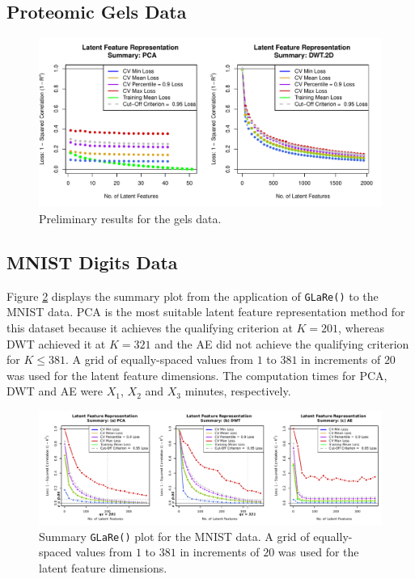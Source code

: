 \subsection{Proteomic Gels Data}\label{sec:gels-reults}

\begin{figure}
    \centering
    \includegraphics[width=1\linewidth]{figures/initial-gels.pdf}
    \caption{Preliminary results for the gels data.}
    \label{fig:enter-label}
\end{figure}


\subsection{MNIST Digits Data}\label{sec:mnist-reults}

Figure \ref{fig:mnist-results} displays the summary plot from the application of \texttt{GLaRe()} to the MNIST data.
PCA is the most suitable latent feature representation method for this dataset because it achieves the qualifying criterion at $K=201$, whereas DWT achieved it at $K=321$ and the AE did not achieve the qualifying criterion for $K \leq 381$.
A grid of equally-spaced values from $1$ to $381$ in increments of $20$ was used for the latent feature dimensions. 
The computation times for PCA, DWT and AE were $X_1$, $X_2$ and $X_3$ minutes, respectively.

\begin{figure}
    \centering
    \includegraphics[width=1\textwidth]{figures/mnist-results.pdf}
    \caption{Summary \texttt{GLaRe()} plot for the MNIST data. A grid of equally-spaced values from $1$ to $381$ in increments of $20$ was used for the latent feature dimensions.}
    \label{fig:mnist-results}
\end{figure}

